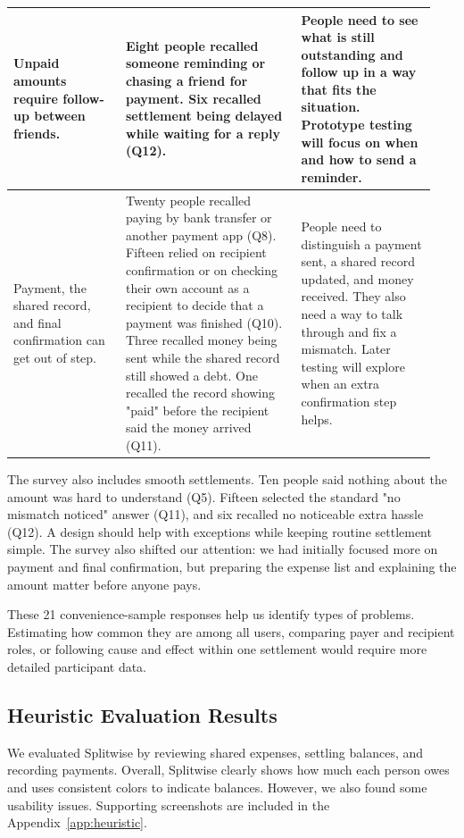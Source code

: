 \documentclass[letterpaper]{jdf}
\begin{document}
{\begin{longtable}{@{}>{\raggedright\arraybackslash}p{0.25\linewidth}>{\raggedright\arraybackslash}p{0.39\linewidth}>{\raggedright\arraybackslash}p{0.30\linewidth}@{}}
\midrule
Unpaid amounts require follow-up between friends. & Eight people recalled someone reminding or chasing a friend for payment. Six recalled settlement being delayed while waiting for a reply (Q12). & People need to see what is still outstanding and follow up in a way that fits the situation. Prototype testing will focus on when and how to send a reminder. \\
\midrule
Payment, the shared record, and final confirmation can get out of step. & Twenty people recalled paying by bank transfer or another payment app (Q8). Fifteen relied on recipient confirmation or on checking their own account as a recipient to decide that a payment was finished (Q10). Three recalled money being sent while the shared record still showed a debt. One recalled the record showing "paid" before the recipient said the money arrived (Q11). & People need to distinguish a payment sent, a shared record updated, and money received. They also need a way to talk through and fix a mismatch. Later testing will explore when an extra confirmation step helps. \\
\end{longtable}
}

The survey also includes smooth settlements. Ten people said nothing about the amount was hard to understand (Q5). Fifteen selected the standard "no mismatch noticed" answer (Q11), and six recalled no noticeable extra hassle (Q12). A design should help with exceptions while keeping routine settlement simple. The survey also shifted our attention: we had initially focused more on payment and final confirmation, but preparing the expense list and explaining the amount matter before anyone pays.

These 21 convenience-sample responses help us identify types of problems. Estimating how common they are among all users, comparing payer and recipient roles, or following cause and effect within one settlement would require more detailed participant data.


\subsection{Heuristic Evaluation Results}

We evaluated Splitwise by reviewing shared expenses, settling balances, and recording payments. Overall, Splitwise clearly shows how much each person owes and uses consistent colors to indicate balances. However, we also found some usability issues. Supporting screenshots are included in the Appendix~\ref{app:heuristic}.
\end{document}
